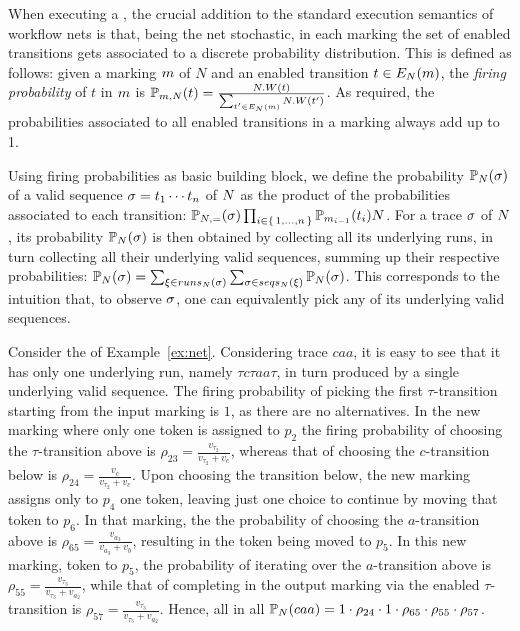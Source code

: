 When executing a \uswn, the crucial addition to the standard execution semantics of workflow nets is that, being the net stochastic, in each marking the set of enabled transitions gets associated to a discrete probability distribution. This is defined as follows: given a marking $\marking$ of $N$ and an enabled transition $t \in \enaset{\marking}{\net}$, the \emph{firing probability} of $t$ in $\marking$ is $\probt{t}{\marking}{\net} = \frac{\net.W(t)}{\sum_{t'\in \enaset{\marking}{\net}}\net.W(t')}$. As required, the probabilities associated to all enabled transitions in a marking always add up to 1.

Using firing probabilities as basic building block, we define the probability $\prob{\seq}{\net}$ of a valid sequence $\seq = t_1\cdots t_n$ of $\net$ as the product of the probabilities associated to each transition: $\probt{\seq}{\net} = \prod_{i \in \set{1,\ldots,n}}\prob{t_i}{\marking_{i-1}}{\net}$. %
For a trace $\trace$ of $\net$, its probability $\prob{\trace}{\net}$ is then obtained by collecting all its underlying runs, in turn collecting all their underlying valid sequences, summing up their respective probabilities: $\prob{\trace}{\net} = \sum_{\run \in \runs{\trace}{\net}} \sum_{\seq \in \seqs{\run}{\net}} \prob{\seq}{\net}$. This corresponds to the intuition that, to observe $\trace$, one can equivalently pick any of its underlying valid sequences.

\begin{example}
  \label{ex:trace}
Consider the \uswn \net of Example~\ref{ex:net}. Considering trace $caa$, it is easy to see that it has only one underlying run, namely $\tau c \tau a a \tau$, in turn produced by a single underlying valid sequence. The firing probability of picking the first $\tau$-transition starting from the input marking is $1$, as there are no alternatives. In the new marking where only one token is assigned to $p_2$ the firing probability of choosing the $\tau$-transition above is $\rho_{23} = \frac{v_{\tau_2}}{v_{\tau_2}+v_c}$, whereas that of choosing the $c$-transition below is $\rho_{24} = \frac{v_c}{v_{\tau_2}+v_c}$. Upon choosing the transition below, the new marking assigns only to $p_4$ one token, leaving just one choice to continue by moving that token to $p_6$. In that marking, the the probability of choosing the $a$-transition above is $\rho_{65} = \frac{v_{a_3}}{v_{a_3}+v_b}$, resulting in the token being moved to $p_5$. In this new marking, token to $p_5$, the probability of iterating over the $a$-transition above is $\rho_{55} = \frac{v_{\tau_3}}{v_{\tau_3}+v_{a_2}}$, while that of completing in the output marking via the enabled $\tau$-transition is $\rho_{57} = \frac{v_{\tau_3}}{v_{\tau_3}+v_{a_2}}$. Hence, all in all $
  \prob{caa}{\net} = 1 \cdot \rho_{24} \cdot 1 \cdot \rho_{65} \cdot \rho_{55} \cdot \rho_{57}$.
\end{example}

